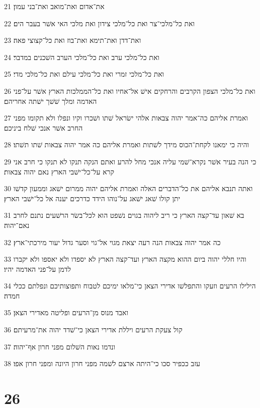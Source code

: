 \par 21 את־אדום ואת־מואב ואת־בני עמון׃
\par 22 ואת כל־מלכי־צר ואת כל־מלכי צידון ואת מלכי האי אשׁר בעבר הים׃
\par 23 ואת־דדן ואת־תימא ואת־בוז ואת כל־קצוצי פאה׃
\par 24 ואת כל־מלכי ערב ואת כל־מלכי הערב השׁכנים במדבר׃
\par 25 ואת כל־מלכי זמרי ואת כל־מלכי עילם ואת כל־מלכי מדי׃
\par 26 ואת כל־מלכי הצפון הקרבים והרחקים אישׁ אל־אחיו ואת כל־הממלכות הארץ אשׁר על־פני האדמה ומלך שׁשׁך ישׁתה אחריהם׃
\par 27 ואמרת אליהם כה־אמר יהוה צבאות אלהי ישׂראל שׁתו ושׁכרו וקיו ונפלו ולא תקומו מפני החרב אשׁר אנכי שׁלח ביניכם׃
\par 28 והיה כי ימאנו לקחת־הכוס מידך לשׁתות ואמרת אליהם כה אמר יהוה צבאות שׁתו תשׁתו׃
\par 29 כי הנה בעיר אשׁר נקרא־שׁמי עליה אנכי מחל להרע ואתם הנקה תנקו לא תנקו כי חרב אני קרא על־כל־ישׁבי הארץ נאם יהוה צבאות׃
\par 30 ואתה תנבא אליהם את כל־הדברים האלה ואמרת אליהם יהוה ממרום ישׁאג וממעון קדשׁו יתן קולו שׁאג ישׁאג על־נוהו הידד כדרכים יענה אל כל־ישׁבי הארץ׃
\par 31 בא שׁאון עד־קצה הארץ כי ריב ליהוה בגוים נשׁפט הוא לכל־בשׂר הרשׁעים נתנם לחרב נאם־יהוה׃
\par 32 כה אמר יהוה צבאות הנה רעה יצאת מגוי אל־גוי וסער גדול יעור מירכתי־ארץ׃
\par 33 והיו חללי יהוה ביום ההוא מקצה הארץ ועד־קצה הארץ לא יספדו ולא יאספו ולא יקברו לדמן על־פני האדמה יהיו׃
\par 34 הילילו הרעים וזעקו והתפלשׁו אדירי הצאן כי־מלאו ימיכם לטבוח ותפוצותיכם ונפלתם ככלי חמדה׃
\par 35 ואבד מנוס מן־הרעים ופליטה מאדירי הצאן׃
\par 36 קול צעקת הרעים ויללת אדירי הצאן כי־שׁדד יהוה את־מרעיתם׃
\par 37 ונדמו נאות השׁלום מפני חרון אף־יהוה׃
\par 38 עזב ככפיר סכו כי־היתה ארצם לשׁמה מפני חרון היונה ומפני חרון אפו׃

\chapter{26}

